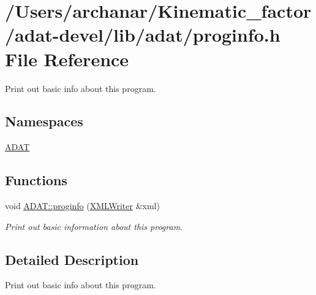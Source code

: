 \hypertarget{adat-devel_2lib_2adat_2proginfo_8h}{}\section{/\+Users/archanar/\+Kinematic\+\_\+factor/adat-\/devel/lib/adat/proginfo.h File Reference}
\label{adat-devel_2lib_2adat_2proginfo_8h}


Print out basic info about this program.  


\subsection*{Namespaces}
\begin{DoxyCompactItemize}
\item 
 \mbox{\hyperlink{namespaceADAT}{A\+D\+AT}}
\end{DoxyCompactItemize}
\subsection*{Functions}
\begin{DoxyCompactItemize}
\item 
void \mbox{\hyperlink{namespaceADAT_a93a8baf56c435bc0fe7bd252601f28f6}{A\+D\+A\+T\+::proginfo}} (\mbox{\hyperlink{classADATXML_1_1XMLWriter}{X\+M\+L\+Writer}} \&xml)
\begin{DoxyCompactList}\small\item\em Print out basic information about this program. \end{DoxyCompactList}\end{DoxyCompactItemize}


\subsection{Detailed Description}
Print out basic info about this program. 


